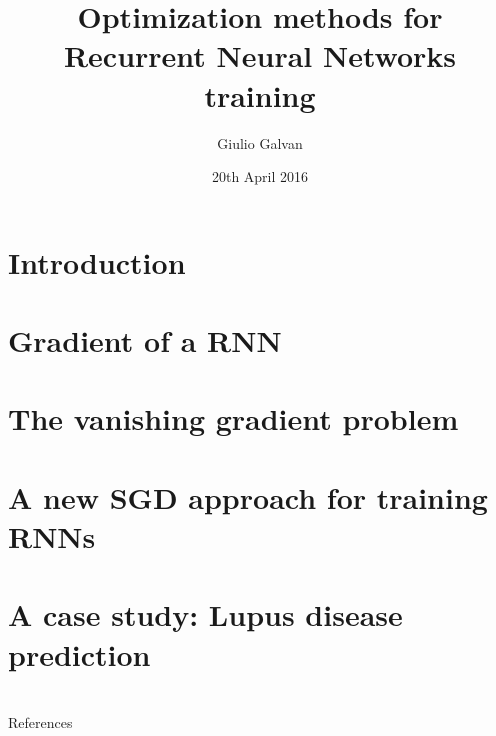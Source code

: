 \documentclass[xcolor=dvipsnames,10pt]{beamer}
\title{Optimization methods for Recurrent Neural Networks training}
\date{20th April 2016}
\author{Giulio Galvan}
\institute{Università degli studi di Firenze}
\def\maketitle{\frame{\titlepage}}
\begin{document}
\addtocounter{framenumber}{-1}
\begin{frame}[plain] \titlepage \end{frame}
\section{Introduction}

\section{Gradient of a RNN}

\section{The vanishing gradient problem}

%
\section{A new SGD approach for training RNNs}

\section{A case study: Lupus disease prediction}


\section{}
\begin{frame}[allowframebreaks]{References}
	
	
\end{frame}
\end{document}
